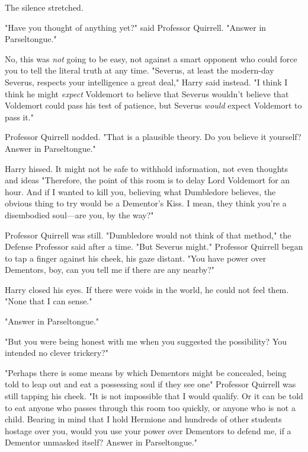 The silence stretched.

"Have you thought of anything yet?" said Professor Quirrell. "Answer in
Parseltongue."

No, this was \emph{not} going to be easy, not against a smart opponent who
could force you to tell the literal truth at any time. "Severus, at least the
modern-day Severus, respects your intelligence a great deal," Harry said
instead. "I think{\el} I think he might \emph{expect} Voldemort to believe
that Severus wouldn't believe that Voldemort could pass his test of patience,
but Severus \emph{would} expect Voldemort to pass it."

Professor Quirrell nodded. "That is a plausible theory. Do you believe it
yourself? Answer in Parseltongue."

 Harry hissed. It might not be safe to withhold information, not
even thoughts and ideas{\el} "Therefore, the point of this room is to delay
Lord Voldemort for an hour. And if I wanted to kill you, believing what
Dumbledore believes, the obvious thing to try would be a Dementor's Kiss. I
mean, they think you're a disembodied soul---are you, by the way?"

Professor Quirrell was still. "Dumbledore would not think of that method," the
Defense Professor said after a time. "But Severus might." Professor Quirrell
began to tap a finger against his cheek, his gaze distant. "You have power over
Dementors, boy, can you tell me if there are any nearby?"

Harry closed his eyes. If there were voids in the world, he could not feel
them. "None that I can sense."

"Answer in Parseltongue."


"But you were being honest with me when you suggested the possibility? You
intended no clever trickery?"


"Perhaps there is some means by which Dementors might be concealed, being told
to leap out and eat a possessing soul if they see one{\el}" Professor
Quirrell was still tapping his cheek. "It is not impossible that I would
qualify. Or it can be told to eat anyone who passes through this room too
quickly, or anyone who is not a child. Bearing in mind that I hold Hermione and
hundreds of other students hostage over you, would you use your power over
Dementors to defend me, if a Dementor unmasked itself? Answer in Parseltongue."

